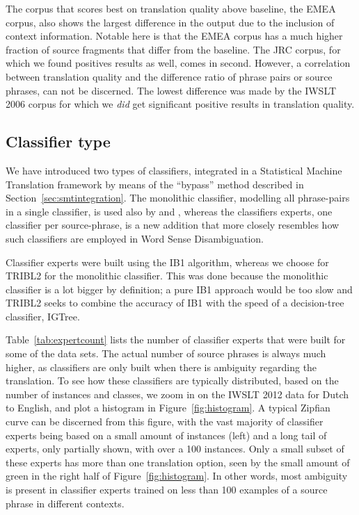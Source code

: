 \documentclass[smallextended]{svjour3}       %
\theoremstyle{break}
\begin{document}
The corpus that scores best on translation quality above baseline, the EMEA
corpus, also shows the largest difference in the output due to the inclusion of
context information. Notable here is that the EMEA corpus has a much higher fraction
of source fragments that differ from the baseline. The JRC corpus, for which we
found positives results as well, comes in second. However, a correlation
between translation quality and the difference ratio of phrase pairs or source
phrases, can not be discerned. The lowest difference was made by the IWSLT 2006
corpus for which we \emph{did} get significant positive results in translation
quality.


\subsection{Classifier type}
\label{sec:typeopt}

We have introduced two types of classifiers, integrated in a Statistical
Machine Translation framework by means of the ``bypass'' method described in
Section~\ref{sec:smtintegration}. The monolithic classifier, modelling all phrase-pairs
in a single classifier, is used also by \cite{Stroppa+07} and
\cite{Rejwanul+11}, whereas the classifiers experts, one classifier per
source-phrase, is a new addition that more closely resembles how such
classifiers are employed in Word Sense Disambiguation.

Classifier experts were built using the IB1 algorithm, whereas we choose for
TRIBL2 for the monolithic classifier. This was done because the monolithic
classifier is a lot bigger by definition; a pure IB1 approach would be too slow
and TRIBL2 seeks to combine the accuracy of IB1 with the speed of a
decision-tree classifier, IGTree.

Table~\ref{tab:expertcount} lists the number of classifier experts that were
built for some of the data sets. The actual number of source phrases is always
much higher, as classifiers are only built when there is ambiguity regarding
the translation. To see how these classifiers are typically distributed, based
on the number of instances and classes, we zoom in on the IWSLT 2012 data for
Dutch to English, and plot a histogram in
Figure~\ref{fig:histogram}. A typical Zipfian curve can be discerned from
this figure, with the vast majority of classifier experts being based
on a small amount of instances (left) and a long tail of experts, only
partially shown, with over a 100 instances. Only a small subset of
these experts has more than one translation option, seen by the small
amount of green in the right half of Figure~\ref{fig:histogram}. In
other words, most ambiguity is present in classifier experts trained on less than
100 examples of a source phrase in different contexts. 
\end{document}
